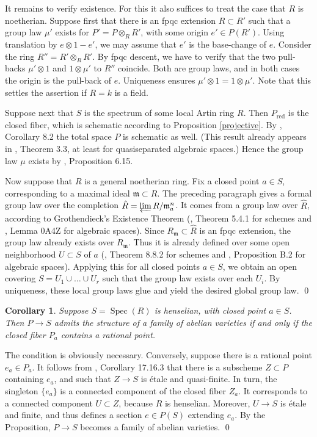 \documentclass[oneside, 12pt]{amsart}
\newcommand\mylabel[1]{\label{#1}\marginpar{\raggedright\vspace{-1ex}\medskip\medskip\footnotesize \tt #1}}
\renewcommand\mylabel[1]{\label{#1}}
\newtheorem{corollary}[theorem]{Corollary}
\theoremstyle{definition}
\theoremstyle{remark}
\newcommand{\invlim}{\varprojlim}
\newcommand{\maxid}{\mathfrak{m}}
\newcommand{\ra}{\rightarrow}
\newcommand{\red}{{\operatorname{red}}}
\newcommand{\Spec}{\operatorname{Spec}}
\begin{document}
It remains to verify existence. For this it also suffices to treat the case that $R$ is noetherian.
Suppose first that there is an fpqc extension $R\subset R'$ such that a group law $\mu'$ 
exists for $P'=P\otimes_RR'$, with some origin $e'\in P(R')$. Using translation by $e\otimes 1-e'$,
we may assume that $e'$ is the base-change of $e$. Consider the ring $R''=R'\otimes_RR'$.
By fpqc descent, we have to verify that the two pull-backs $\mu'\otimes 1$ and $1\otimes \mu'$ to $R''$ coincide.
Both are group laws, and in both cases the origin is the pull-back of $e$.
Uniqueness ensures $\mu'\otimes 1 = 1\otimes\mu'$.
Note that this settles the assertion  if $R=k$ is a field.

Suppose next that $S$ is the spectrum of some  local Artin ring $R$.
Then $P_\red $ is the closed fiber, which is schematic according to  Proposition \ref{projective}.
By \cite{Rydh 2015}, Corollary 8.2 the total space $P$ is schematic as well. (This result already
appears in \cite{Knutson 1971}, Theorem 3.3, at least for quasiseparated algebraic spaces.)
Hence the group law $\mu$ exists by  \cite{Mumford; Fogarty; Kirwan 1993}, Proposition 6.15.

Now suppose that $R$ is a general noetherian ring.
Fix a closed  point $a\in S$, corresponding to a maximal ideal $\maxid\subset R$.
The preceding paragraph gives a formal group law over the completion $\hat{R}=\invlim R/\maxid_a^n$.
It comes from a  group law over   $\hat{R}$, according to 
Grothendieck's Existence Theorem (\cite{EGA IIIa}, Theorem  5.4.1 for schemes
and \cite{SP}, 
Lemma 0A4Z for algebraic spaces).
Since $R_\maxid\subset \hat{R}$ is an fpqc extension, the group law already exists over $R_\maxid$.
Thus it is already defined over some open neighborhood $U\subset S$ of $a$
(\cite{EGA IVc}, Theorem 8.8.2 for schemes and \cite{Rydh 2015}, Proposition B.2 for algebraic spaces).
Applying this for all closed points $a\in S$, we obtain an open covering $S=U_1\cup\ldots\cup U_r$
such that the group law exists over each $U_i$. By uniqueness, these  local group laws glue and yield
the desired global group law.
\qed
 
\begin{corollary}
\mylabel{stricly henselian}
Suppose $S=\Spec(R)$ is   henselian, with closed point $a\in S$. Then $P\ra S$ admits the structure of a  family of abelian varieties if and only if 
the closed fiber $P_a$ contains a rational point. 
\end{corollary}

\proof
The condition is obviously necessary. Conversely, suppose there is a rational point $e_a\in P_a$.
It follows from \cite{EGA IVd}, Corollary 17.16.3 that 
there is a subscheme $Z\subset P$ containing $e_a$, and such that $Z\ra S$ is \'etale and quasi-finite.
In turn, the singleton $\{e_a\}$ is a connected component of the closed fiber $Z_a$. 
It corresponds to a connected component $U\subset Z$, because $R$ is henselian. Moreover, $U\ra S$ is \'etale and finite,
and thus defines a section $e\in P(S)$ extending $e_a$. By the Proposition, $P\ra S$ becomes a family of abelian varieties.
\qed
\end{document}
